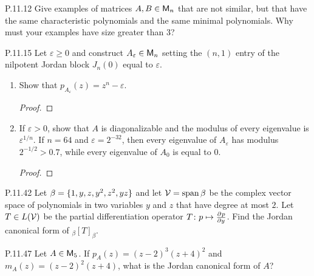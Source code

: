 \documentclass{../homework}
\begin{document}
\begin{problems}
\item[P.11.12] Give examples of matrices \(A, B \in \mathsf{M}_n\) that are
  not similar, but that have the same characteristic polynomials and
  the same minimal polynomials.  Why must your examples have size
  greater than 3?

  \begin{solution}

  \end{solution}

\item[P.11.15] Let \(\varepsilon \ge 0\) and construct
  \(A_\varepsilon \in \mathsf{M}_n\) setting the \((n, 1)\) entry of the
  nilpotent Jordan block \(J_n(0)\) equal to \(\varepsilon\).
  \begin{enumerate}
  \item Show that \(p_{A_\varepsilon} (z) = z^n - \varepsilon\).

    \begin{solution}
      \begin{proof}

      \end{proof}
    \end{solution}

  \item If \(\varepsilon > 0\), show that \(A\) is diagonalizable and
    the modulus of every eigenvalue is \(\varepsilon^{1/n}\).  If
    \(n=64\) and \(\varepsilon = 2^{-32}\), then every eigenvalue of
    \(A_\varepsilon\) has modulus \(2^{-1/2} > 0.7\), while every
    eigenvalue of \(A_0\) is equal to \(0\).

    \begin{solution}
      \begin{proof}

      \end{proof}
    \end{solution}
  \end{enumerate}

\item[P.11.42] Let \(\beta = \{ {1, y, z, y^2, z^2, yz} \}\) and let
  \(\mathcal{V} = \operatorname*{span} \beta\) be the complex vector space of
  polynomials in two variables \(y\) and \(z\) that have degree at
  most \(2\).  Let \(T \in L(\mathcal{V})\) be the partial differentiation
  operator \(T \colon p \mapsto \frac{\mathop{}\! \partial^{} {p}}{\mathop{}\! \partial {y}^{}}\).  Find the Jordan canonical
  form of \(_\beta[T]_\beta\).

  \begin{solution}

  \end{solution}

\item[P.11.47] Let \(A \in \mathsf{M}_5\).  If \(p_A(z) = (z-2)^3 (z+4)^2\)
  and \(m_A(z) = (z-2)^2 (z+4)\), what is the Jordan canonical form of
  \(A\)?

  \begin{solution}

  \end{solution}
\end{problems}
\end{document}
